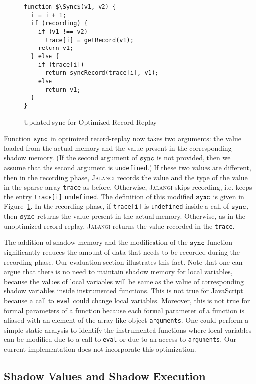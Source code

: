 \documentclass{sig-alternate}
\def\jalangi{\textsc{Jalangi}}
\newcommand \dsl [1] {\ensuremath{{\tt #1}}\xspace}
\newcommand \Sync{\dsl{sync}}
\begin{document}
\lstset{language=JavaScript}
\begin{figure}
 {\small 
\begin{lstlisting}[mathescape]
function $\Sync$(v1, v2) {
  i = i + 1;
  if (recording) {
    if (v1 !== v2)
      trace[i] = getRecord(v1);
    return v1;
  } else {
    if (trace[i])
      return syncRecord(trace[i], v1);
    else
      return v1;
  }
}
\end{lstlisting}
}
  \caption{Updated sync for Optimized Record-Replay}
  \label{fig:libsync}
\end{figure}

Function $\Sync$ in optimized record-replay now takes two arguments:
the value loaded from the actual memory and the value present in the
corresponding shadow memory.  (If the second argument of $\Sync$ is
not provided, then we assume that the second argument is
\texttt{undefined}.)  If these two values are different, then in the
recording phase, \jalangi{} records the value and the type of the
value in the sparse array \texttt{trace} as before.  Otherwise,
\jalangi{} skips recording, i.e. keeps the entry \texttt{trace[i]}
\texttt{undefined}.  The definition of this modified $\Sync$ is given
in Figure~\ref{fig:libsync}.  In the recording phase, if
\texttt{trace[i]} is \texttt{undefined} inside a call of $\Sync$, then
$\Sync$ returns the value present in the actual memory.  Otherwise, as
in the unoptimized record-replay, \jalangi{} returns the value
recorded in the \texttt{trace}.

The addition of shadow memory and the modification of the $\Sync$
function significantly reduces the amount of data that needs to be
recorded during the recording phase.  Our evaluation section
illustrates this fact.  Note that one can argue that there is no need
to maintain shadow memory for local variables, because the values of
local variables will be same as the value of corresponding shadow
variables inside instrumented functions.  This is not true for
JavaScript because a call to \texttt{eval} could change local
variables.  Moreover, this is not true for formal parameters of a
function because each formal parameter of a function is aliased with
an element of the array-like object \texttt{arguments}.  One could
perform a simple static analysis to identify the instrumented
functions where local variables can be modified due to a call to
\texttt{eval} or due to an access to \texttt{arguments}.  Our current
implementation does not incorporate this optimization.

\subsection{Shadow Values and Shadow Execution}
\label{sec:shadow-values-shadow}
\end{document}
